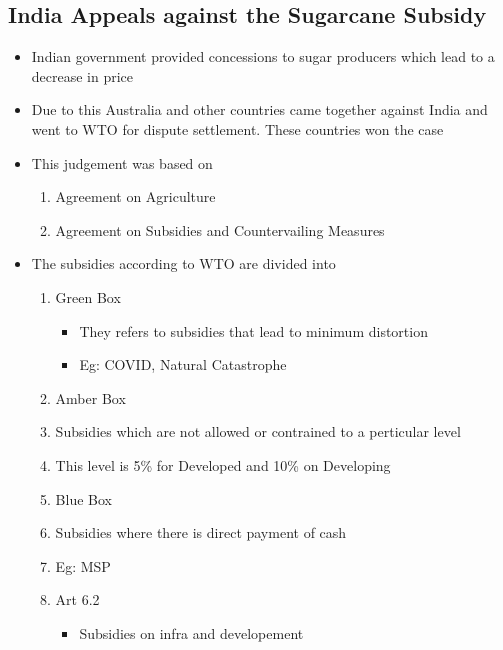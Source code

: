 \documentclass[11pt]{article}
\begin{document}
\subsection{India Appeals against the Sugarcane Subsidy}
\label{sec:orgf1672bb}
\begin{itemize}
\item Indian government provided concessions to sugar producers which lead to a decrease in price
\item Due to this Australia and other countries came together against India and went to WTO for dispute settlement. These countries won the case
\item This judgement was based on
\begin{enumerate}
\item Agreement on Agriculture
\item Agreement on Subsidies and Countervailing Measures
\end{enumerate}
\item The subsidies according to WTO are divided into
\begin{enumerate}
\item Green Box
\begin{itemize}
\item They refers to subsidies that lead to minimum distortion
\item Eg: COVID, Natural Catastrophe
\end{itemize}
\item Amber Box
\item Subsidies which are not allowed or contrained to a perticular level
\item This level is 5\% for Developed and 10\% on Developing
\item Blue Box
\item Subsidies where there is direct payment of cash
\item Eg: MSP
\item Art 6.2
\begin{itemize}
\item Subsidies on infra and developement
\end{itemize}
\end{enumerate}
\end{itemize}
\end{document}
